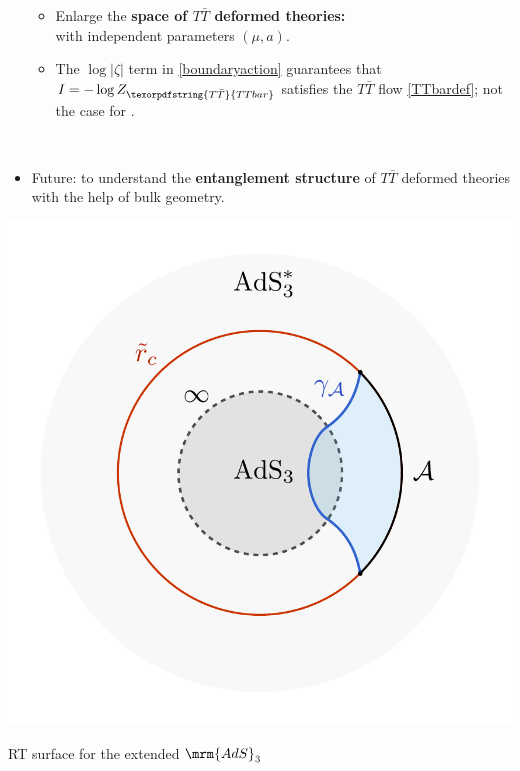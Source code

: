 \documentclass[10pt]{article}
\newcommand{\citations}[1]{{\footnotesize#1\par}}
\newcommand{\TTbar}{\texorpdfstring{\ensuremath{T\bar{T}}}{TTbar}\xspace}
\begin{document}
\begin{multicols}{3}
\begin{itemize}
\begin{itemize}
	\item Enlarge the \textbf{space of \TTbar deformed theories:}\\
	with \mbox{independent} parameters $(\mu,a)$.
	
	\item The $\log |\zeta|$ term in \eqref{boundaryaction} guarantees that $I = -\log Z_{\TTbar}$ satisfies the $T\bar T$ flow \eqref{TTbardef}; not the case for \cite{Donnelly:2018bef}.
	\end{itemize}

	
	\begin{flushright}
		\vspace{-.6\baselineskip}
		\citations{
			\textcite{Caputa:2020lpa}\\
			\textcite{Li:2020zjb}
		}\vspace{-.8\baselineskip}
	\end{flushright}
	
	\item Future: to understand the \textbf{entanglement structure} of \TTbar deformed theories with the help of bulk geometry.
	\begin{flushright}
		\vspace{-.5\baselineskip}
		\citations{
			\textcite{Lewkowycz:2019xse}
		}
	\end{flushright}
\end{itemize}
\centering\vspace{-.8\baselineskip}
\includegraphics[width=.5\linewidth]{img/RT-AdS.pdf}

\vspace{-1.2\baselineskip}
{\footnotesize RT surface for the extended $\mrm{AdS}_3$}

%
%

\end{multicols}
\end{document}
